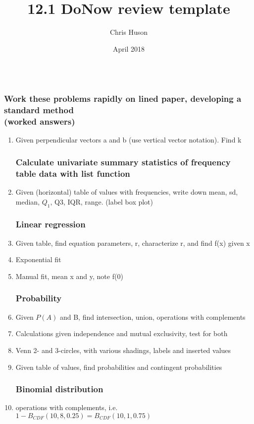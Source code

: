 \documentclass[12pt, oneside]{article}
\title{12.1 DoNow review template}
\author{Chris Huson}
\date{April 2018}
\begin{document}
\subsubsection*{\\ \textnormal{Work these problems rapidly on lined paper, developing a standard method \\(worked answers)}}

\begin{enumerate}
\subsubsection*{Vector dot product is zero for perpendiculars}
\item Given perpendicular vectors a and b (use vertical vector notation). Find k

\subsubsection*{Calculate univariate summary statistics of frequency table data with list function}
\item Given (horizontal) table of values with frequencies, write down mean, sd, median, $Q_1$, Q3, IQR, range. (label box plot)

\subsubsection*{Linear regression}
\item Given table, find equation parameters, r, characterize r, and find f(x) given x
\item Exponential fit
\item Manual fit, mean x and y, note f(0)

\subsubsection*{Probability}
\item Given $P(A)$ and B, find intersection, union, operations with complements
\item Calculations given independence and mutual exclusivity, test for both
\item Venn 2- and 3-circles, with various shadings, labels and inserted values
\item Given table of values, find probabilities and contingent probabilities

\subsubsection*{Binomial distribution}
\item operations with complements, i.e. $1-B_{CDF}(10,8,0.25)=B_{CDF}(10,1,0.75)$


\end{enumerate}
\end{document}
